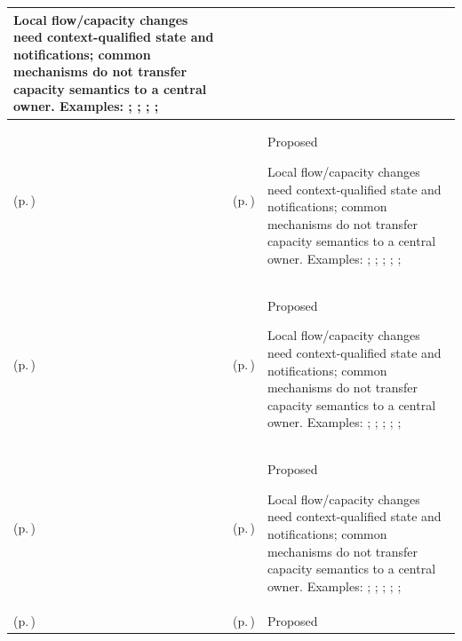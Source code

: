 \begin{longtable}{|>{\raggedright\arraybackslash}p{0.27\TableWidth}|>{\raggedright\arraybackslash}p{0.27\TableWidth}|>{\raggedright\arraybackslash}p{0.46\TableWidth}|}
Local flow/capacity changes need context-qualified state and notifications; common mechanisms do not transfer capacity semantics to a central owner. Examples: \nameref{feature:feat-hso-07}; \nameref{feature:feat-hso-08}; \nameref{function:coordinate-ed-departmental-capacity}; \nameref{service:ed-operational-status-query}; \nameref{feature:emergency-treatment-capacity-management}\\\hline
\nameref{cap:bec-outpatient-operations} (p.\,\pageref{cap:bec-outpatient-operations}) & \nameref{cap:ec-02} (p.\,\pageref{cap:ec-02}) & Proposed

Local flow/capacity changes need context-qualified state and notifications; common mechanisms do not transfer capacity semantics to a central owner. Examples: \nameref{feature:feat-hso-09}; \nameref{feature:feat-hso-10}; \nameref{function:manage-outpatient-capacity}; \nameref{service:ambulatory-session-status-query}; \nameref{function:capture-post-clinic-follow-up-requirements}; \nameref{feature:outpatient-appointment-capacity-management}\\\hline
\nameref{cap:bec-outpatient-operations} (p.\,\pageref{cap:bec-outpatient-operations}) & \nameref{cap:ec-03} (p.\,\pageref{cap:ec-03}) & Proposed

Local flow/capacity changes need context-qualified state and notifications; common mechanisms do not transfer capacity semantics to a central owner. Examples: \nameref{feature:feat-hso-09}; \nameref{feature:feat-hso-10}; \nameref{function:manage-outpatient-capacity}; \nameref{service:ambulatory-session-status-query}; \nameref{function:capture-post-clinic-follow-up-requirements}; \nameref{feature:outpatient-appointment-capacity-management}\\\hline
\nameref{cap:bec-outpatient-operations} (p.\,\pageref{cap:bec-outpatient-operations}) & \nameref{cap:ec-09} (p.\,\pageref{cap:ec-09}) & Proposed

Local flow/capacity changes need context-qualified state and notifications; common mechanisms do not transfer capacity semantics to a central owner. Examples: \nameref{feature:feat-hso-09}; \nameref{feature:feat-hso-10}; \nameref{function:manage-outpatient-capacity}; \nameref{service:ambulatory-session-status-query}; \nameref{function:capture-post-clinic-follow-up-requirements}; \nameref{feature:outpatient-appointment-capacity-management}\\\hline
\nameref{cap:bec-mobile-staff-management} (p.\,\pageref{cap:bec-mobile-staff-management}) & \nameref{cap:ec-02} (p.\,\pageref{cap:ec-02}) & Proposed


\end{longtable}
